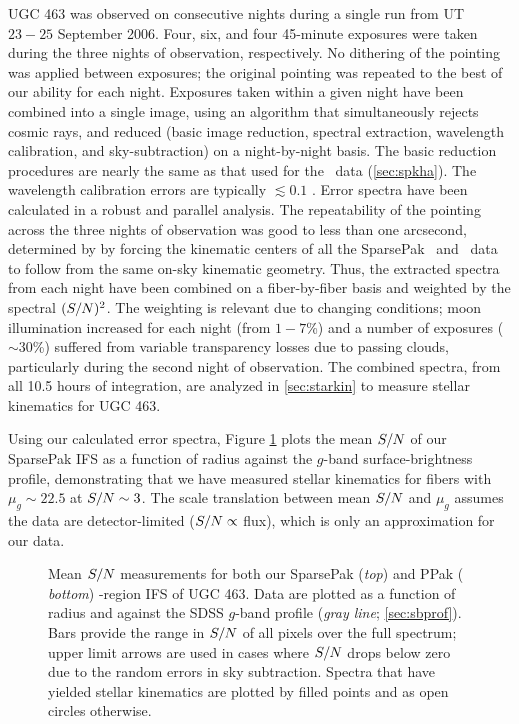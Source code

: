 \documentclass[apj,iop,numberedappendix]{emulateapj}
\begin{document}
UGC 463 was observed on consecutive nights during a single run from UT $23-25$
September 2006.  Four, six, and four 45-minute exposures were taken during the
three nights of observation, respectively.  No dithering of the pointing was
applied between exposures; the original pointing was repeated to the best of our
ability for each night.  Exposures taken within a given night have been combined
into a single image, using an algorithm that simultaneously rejects cosmic rays,
and reduced (basic image reduction, spectral extraction, wavelength calibration,
and sky-subtraction) on a night-by-night basis.  The basic reduction procedures
are nearly the same as that used for the \halp\ data (\sect \ref{sec:spkha}).
The wavelength calibration errors are typically $\lesssim 0.1$ \kms.  Error
spectra have been calculated in a robust and parallel analysis.  The
repeatability of the pointing across the three nights of observation was good to
less than one arcsecond, determined by \citet{KBWPhD} by forcing the kinematic
centers of all the SparsePak \halp\ and \oiii\ data to follow from the same
on-sky kinematic geometry.  Thus, the extracted spectra from each night have
been combined on a fiber-by-fiber basis and weighted by the spectral
$(S/N)^2$.  The weighting is relevant due to changing conditions; moon
illumination increased for each night (from $1-7$\%) and a number of exposures
($\sim30$\%) suffered from variable transparency losses due to passing clouds,
particularly during the second night of observation.  The combined spectra, from
all 10.5 hours of integration, are analyzed in \sect \ref{sec:starkin} to
measure stellar kinematics for UGC 463.

Using our calculated error spectra, Figure \ref{fig:sn} plots the mean $S/N$
of our SparsePak IFS as a function of radius against the $g$-band
surface-brightness profile, demonstrating that we have measured stellar
kinematics for fibers with $\mu_g\sim 22.5$ at $S/N\sim 3$.  The scale
translation between mean $S/N$ and $\mu_g$ assumes the data are
detector-limited ($S/N\propto$ flux), which is only an approximation for our
data.

\begin{figure}
\caption{
%
Mean $S/N$ measurements for both our SparsePak ({\it top}) and PPak ({\it
bottom}) \mgi-region IFS of UGC 463.  Data are plotted as a function of radius
and against the SDSS $g$-band profile ({\it gray line}; \sect \ref{sec:sbprof}).
Bars provide the range in $S/N$ of all pixels over the full spectrum; upper
limit arrows are used in cases where $S/N$ drops below zero due to the random
errors in sky subtraction.  Spectra that have yielded stellar kinematics are
plotted by filled points and as open circles otherwise.
%
}
\label{fig:sn}
\end{figure}
\end{document}
